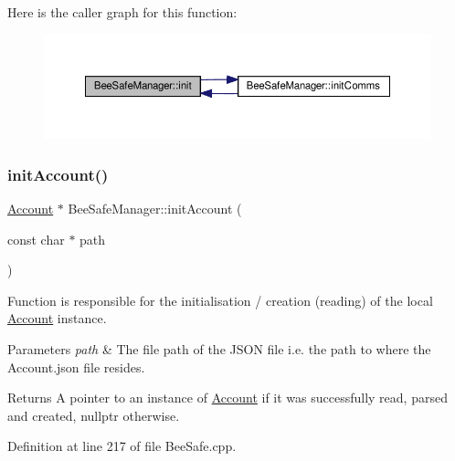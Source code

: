 Here is the caller graph for this function\+:\nopagebreak
\begin{figure}[H]
\begin{center}
\leavevmode
\includegraphics[width=350pt]{d5/d75/class_bee_safe_manager_a2f16b09c454e21c887d14ac5483973cf_icgraph}
\end{center}
\end{figure}
\mbox{\label{class_bee_safe_manager_a7395aeacd246ce69c65f255a2eab1d04}} 
\subsubsection{\texorpdfstring{init\+Account()}{initAccount()}}
{\footnotesize\ttfamily \hyperlink{class_account}{Account} $\ast$ Bee\+Safe\+Manager\+::init\+Account (\begin{DoxyParamCaption}\item[{const char $\ast$}]{path }\end{DoxyParamCaption})\hspace{0.3cm}{\ttfamily [private]}}

Function is responsible for the initialisation / creation (reading) of the local \hyperlink{class_account}{Account} instance.


\begin{DoxyParams}{Parameters}
{\em path} & The file path of the J\+S\+ON file i.\+e. the path to where the Account.\+json file resides. \\
\hline
\end{DoxyParams}
\begin{DoxyReturn}{Returns}
A pointer to an instance of \hyperlink{class_account}{Account} if it was successfully read, parsed and created, nullptr otherwise. 
\end{DoxyReturn}


Definition at line 217 of file Bee\+Safe.\+cpp.


